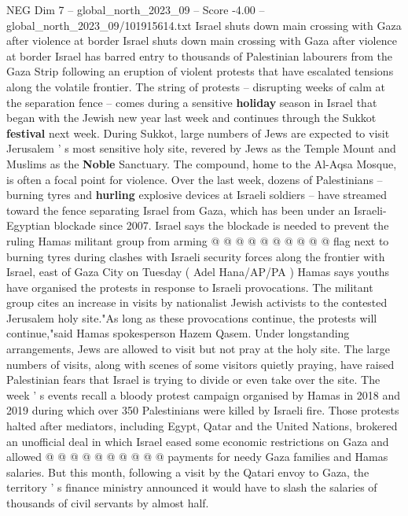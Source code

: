 \begin{textsample}{NEG Dim 7 – global\_north\_2023\_09 – Score -4.00 – global\_north\_2023\_09/101915614.txt}  \label{ex:f7_neg_163}
Israel shuts down main crossing with Gaza after violence at border Israel shuts down main crossing with Gaza after violence at border Israel has barred entry to thousands of Palestinian labourers from the Gaza Strip following an eruption of violent protests that have escalated tensions along the volatile frontier.
The string of protests -- disrupting weeks of calm at the separation fence -- comes during a sensitive \textbf{holiday} season in Israel that began with the Jewish new year last week and continues through the Sukkot \textbf{festival} next week.
During Sukkot, large numbers of Jews are expected to visit Jerusalem ' s most sensitive holy site, revered by Jews as the Temple Mount and Muslims as the \textbf{Noble} Sanctuary.
The compound, home to the Al-Aqsa Mosque, is often a focal point for violence.
Over the last week, dozens of Palestinians -- burning tyres and \textbf{hurling} explosive devices at Israeli soldiers -- have streamed toward the fence separating Israel from Gaza, which has been under an Israeli-Egyptian blockade since 2007.
Israel says the blockade is needed to prevent the ruling Hamas militant group from arming @ @ @ @ @ @ @ @ @ @ flag next to burning tyres during clashes with Israeli security forces along the frontier with Israel, east of Gaza City on Tuesday ( Adel Hana/AP/PA ) Hamas says youths have organised the protests in response to Israeli provocations.
The militant group cites an increase in visits by nationalist Jewish activists to the contested Jerusalem holy site."As long as these provocations continue, the protests will continue,"said Hamas spokesperson Hazem Qasem.
Under longstanding arrangements, Jews are allowed to visit but not pray at the holy site.
The large numbers of visits, along with scenes of some visitors quietly praying, have raised Palestinian fears that Israel is trying to divide or even take over the site.
The week ' s events recall a bloody protest campaign organised by Hamas in 2018 and 2019 during which over 350 Palestinians were killed by Israeli fire.
Those protests halted after mediators, including Egypt, Qatar and the United Nations, brokered an unofficial deal in which Israel eased some economic restrictions on Gaza and allowed @ @ @ @ @ @ @ @ @ @ payments for needy Gaza families and Hamas salaries.
But this month, following a visit by the Qatari envoy to Gaza, the territory ' s finance ministry announced it would have to slash the salaries of thousands of civil servants by almost half.

\end{textsample}
